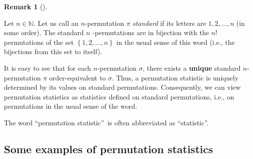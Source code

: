 \documentclass[numbers=enddot,12pt,final,onecolumn,notitlepage]{scrartcl}%
\theoremstyle{definition}
\newtheorem{remk}[theo]{Remark}
\newenvironment{remark}[1][]
{\begin{remk}[#1]\begin{leftbar}}
{\end{leftbar}\end{remk}}
\begin{document}
\begin{remark}
Let $n\in\mathbb{N}$. Let us call an $n$-permutation $\pi$ \textit{standard}
if its letters are $1,2,\ldots,n$ (in some order). The standard $n$%
-permutations are in bijection with the $n!$ permutations of the set $\left\{
1,2,\ldots,n\right\}  $ in the usual sense of this word (i.e., the bijections
from this set to itself).

It is easy to see that for each $n$-permutation $\sigma$, there exists a
\textbf{unique} standard $n$-permutation $\pi$ order-equivalent to $\sigma$.
Thus, a permutation statistic is uniquely determined by its values on standard
permutations. Consequently, we can view permutation statistics as statistics
defined on standard permutations, i.e., on permutations in the usual sense of
the word.
\end{remark}

The word \textquotedblleft permutation statistic\textquotedblright\ is often
abbreviated as \textquotedblleft statistic\textquotedblright.

\subsection{Some examples of permutation statistics}
\end{document}
